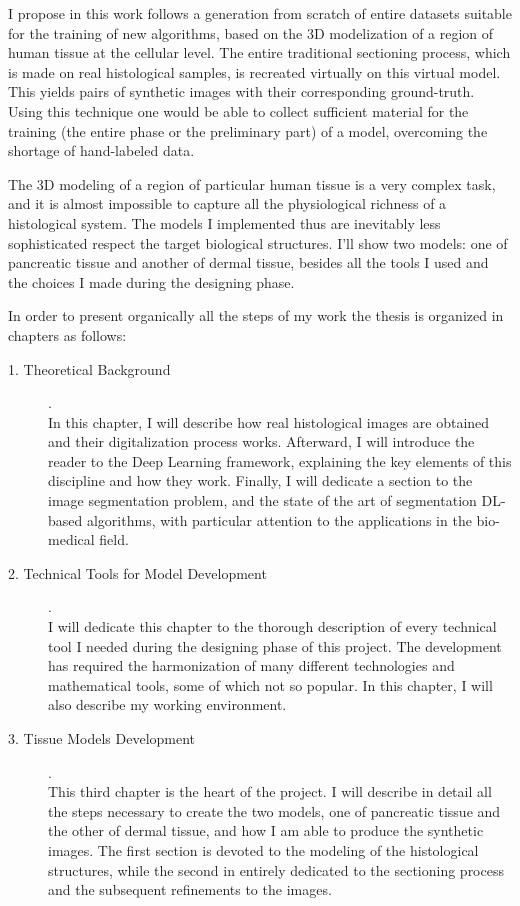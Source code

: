 \documentclass[12pt,a4paper]{report}
\providecommand{\DIFaddtex}[1]{{\protect\color{blue}\uwave{#1}}} %
\providecommand{\DIFaddend}{} %
\providecommand{\DIFdelbegin}{} %
\providecommand{\DIFdelend}{} %
\providecommand{\DIFadd}[1]{\texorpdfstring{\DIFaddtex{#1}}{#1}} %
\newcommand{\DIFscaledelfig}{0.5}
\newlength{\DIFdelgraphicswidth} %
\newlength{\DIFdelgraphicsheight} %
\newcommand{\DIFdelincludegraphics}[2][]{%
\sbox{\DIFdelgraphicsbox}{\DIFOincludegraphics[#1]{#2}}%
\settoboxwidth{\DIFdelgraphicswidth}{\DIFdelgraphicsbox} %
\settoboxtotalheight{\DIFdelgraphicsheight}{\DIFdelgraphicsbox} %
\scalebox{\DIFscaledelfig}{%
\parbox[b]{\DIFdelgraphicswidth}{\usebox{\DIFdelgraphicsbox}\\[-\baselineskip] \rule{\DIFdelgraphicswidth}{0em}}\llap{\resizebox{\DIFdelgraphicswidth}{\DIFdelgraphicsheight}{%
\setlength{\unitlength}{\DIFdelgraphicswidth}%
\begin{picture}(1,1)%
\thicklines\linethickness{2pt} %
{\color[rgb]{1,0,0}\put(0,0){\framebox(1,1){}}}%
{\color[rgb]{1,0,0}\put(0,0){\line( 1,1){1}}}%
{\color[rgb]{1,0,0}\put(0,1){\line(1,-1){1}}}%
\end{picture}%
}\hspace*{3pt}}} %
} %
\DeclareRobustCommand{\DIFaddend}{\DIFOaddend \let\includegraphics\DIFOincludegraphics} %
\DeclareRobustCommand{\DIFdelbegin}{\DIFOdelbegin \let\includegraphics\DIFdelincludegraphics} %
\DeclareRobustCommand{\DIFdelend}{\DIFOaddend \let\includegraphics\DIFOincludegraphics} %
\begin{document}
\DIFadd{The technique }\DIFaddend I propose in this work follows a generation from scratch of entire datasets suitable for the training of new algorithms, based on the 3D modelization of a region of human tissue at the cellular level. The entire traditional sectioning process, which is made on real histological samples, is recreated virtually on this virtual model. This yields pairs of synthetic images with their corresponding ground-truth. Using this technique one would be able to collect sufficient material for the training (the entire phase or the preliminary part) of a model, overcoming the shortage of hand-labeled data. \DIFdelbegin %

\DIFdelend The 3D modeling of a region of particular human tissue is a very complex task, and it is almost impossible to capture all the physiological richness of a histological system. The models I implemented thus are inevitably less sophisticated respect the target biological structures. I'll show two models: one of pancreatic tissue and another of dermal tissue, besides all the tools I used and the choices I made during the designing phase.

In order to present organically all the steps of my work the thesis is organized in chapters as follows:

\begin{description}
    \item [1. Theoretical Background]. \hfill \\
    In this chapter, I will describe how real histological images are obtained and their digitalization process works. Afterward, I will introduce the reader to the Deep Learning framework, explaining the key elements of this discipline and how they work. Finally, I will dedicate a section to the image segmentation problem, and the state of the art of segmentation DL-based algorithms, with particular attention to the applications in the bio-medical field.

    \item [2. Technical Tools for Model Development]. \hfill \\
    I will dedicate this chapter to the thorough description of every technical tool I needed during the designing phase of this project. The development has required the harmonization of many different technologies and mathematical tools, some of which not so popular. In this chapter, I will also describe my working environment.

    \item [3. Tissue Models Development]. \hfill \\
    This third chapter is the heart of the project. I will describe in detail all the steps necessary to create the two models, one of pancreatic tissue and the other of dermal tissue, and how I am able to produce the synthetic images. The first section is devoted to the modeling of the histological structures, while the second in entirely dedicated to the sectioning process and the subsequent refinements to the images.
\end{description}
\end{document}
